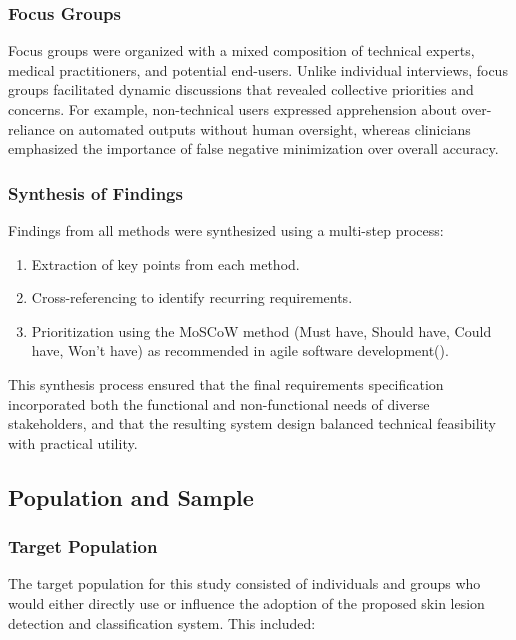 \documentclass[
  12pt,
  oneside]{article}
\providecommand{\tightlist}{%
  \setlength{\itemsep}{0pt}\setlength{\parskip}{0pt}}
\begin{document}
\subsubsection{Focus Groups}\label{focus-groups}

Focus groups were organized with a mixed composition of technical
experts, medical practitioners, and potential end-users. Unlike
individual interviews, focus groups facilitated dynamic discussions that
revealed collective priorities and concerns. For example, non-technical
users expressed apprehension about over-reliance on automated outputs
without human oversight, whereas clinicians emphasized the importance of
false negative minimization over overall accuracy.

\subsubsection{Synthesis of Findings}\label{synthesis-of-findings}

Findings from all methods were synthesized using a multi-step process:

\begin{enumerate}
\def\labelenumi{\arabic{enumi}.}
\tightlist
\item
  Extraction of key points from each method.
\item
  Cross-referencing to identify recurring requirements.
\item
  Prioritization using the MoSCoW method (Must have, Should have, Could
  have, Won't have) as recommended in agile software
  development().
\end{enumerate}

This synthesis process ensured that the final requirements specification
incorporated both the functional and non-functional needs of diverse
stakeholders, and that the resulting system design balanced technical
feasibility with practical utility.

\subsection{Population and Sample}\label{population-and-sample}

\subsubsection{Target Population}\label{target-population}

The target population for this study consisted of individuals and groups
who would either directly use or influence the adoption of the proposed
skin lesion detection and classification system. This included:
\end{document}
